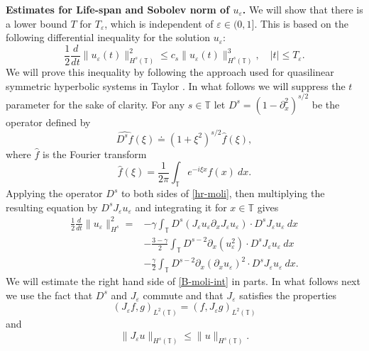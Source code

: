 \documentclass[12pt,reqno]{amsart}
\newcommand{\p}{\partial}
\newcommand{\ci}{\mathbb{T}}
\newcommand{\ee}{\varepsilon}
\theoremstyle{plain}  %
\theoremstyle{definition}
\begin{document}
\begin{appendices}
%
%


%
%
{\bf Estimates  for Life-span and Sobolev norm of $u_\ee$.}
%
We will show that there is a lower bound  $T$
for $T_\ee$, which is  independent of $\ee\in(0, 1]$.
This is based on the following differential
inequality for the solution $u_\ee$:
%
\begin{equation} 
	\label{B-diff-ineq}
	\frac 12
	\frac{d}{dt}
	\|u_\ee(t)\|_{H^{s}(\ci)}^2
	\le
	c_s
	\|u_\ee(t)\|_{H^{s}(\ci)}^3,
	\quad
	|t| \le T_\ee.
\end{equation}
%
%
We will prove this inequality  by
following the approach used for quasilinear symmetric
hyperbolic systems in Taylor  \cite{t1}. In what follows we will suppress the
$t$ parameter for the sake of clarity.
%
For any $s\in \ci$ let   $D^s=(1-\p_x^2)^{s/2}$ be the  operator
defined by 
%
$$ \widehat{D^s f}(\xi) \doteq (1 + \xi^2)^{s/2} \widehat{f}(\xi), $$
%
where $ \widehat{f}$ is the Fourier transform
%
$$ \widehat{f}(\xi) =  \frac{1}{2\pi}\int_{\ci} e^{-i \xi x} f(x) \ dx.  $$
%
Applying the operator $D^s$ to  both sides of  \eqref{hr-moli},
then  multiplying the resulting equation by $D^s J_\ee u_\ee$
and integrating it for $x\in\ci$ gives
%
\begin{equation} 
	\begin{split}
		\label{B-moli-int}
		\frac 12
		\frac{d}{dt} \|u_\ee \|_{H^s}^2
		=
		&-
		\gamma \int_{\ci}  D^s(J_\ee u_\ee \partial_x J_\ee u_\ee) \cdot
		D^s J_\ee u_\ee  \  dx
		\\
		&- \frac{3 -\gamma}{2} \int_{\ci} D^{s-2} \p_x (u_{\ee}^2) 
		\cdot D^s J_\ee u_{\ee} \ dx
		\\
		&- \frac{\gamma}{2} \int_{\ci}  D^{s-2} \p_x (\p_x u_\ee)^2
		\cdot D^s J_\ee u_\ee  \ dx.
	\end{split}
\end{equation}
%
We will estimate the right hand side of \eqref{B-moli-int} in parts. In
what follows next we use the fact that  $D^s$ and $J_\ee$ commute and
that  $J_\ee$ satisfies the properties 
%
\begin{equation} 
	\label{J-e-inner-prod-property}
	(J_\ee f, g)_{L^2(\ci)}=( f, J_\ee g)_{L^2(\ci)}
\end{equation}
%
and
%
\begin{equation} 
	\label{Je-u-Hs}
	\| J_\ee u \|_{H^s(\ci)}
	\le
	\|  u \|_{H^s(\ci)}.
\end{equation}
%



\end{appendices}
\end{document}
